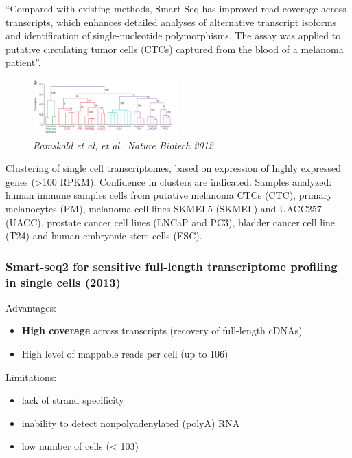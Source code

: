 ``Compared with existing methods, Smart-Seq has improved read coverage
across transcripts, which enhances detailed analyses of alternative
transcript isoforms and identification of single-nucleotide
polymorphisms. The assay was applied to putative circulating tumor cells
(CTCs) captured from the blood of a melanoma patient''.

\begin{figure}
\centering
\includegraphics[width=0.5\textwidth]{images/Screen_Shot_2023-02-21_at_19-30-18.png}
\caption{\emph{Ramskold et al, et al.~Nature Biotech 2012}}
\end{figure}

Clustering of single cell transcriptomes, based on expression of highly
expressed genes (\textgreater100 RPKM). Confidence in clusters are
indicated. Samples analyzed: human immune samples cells from putative
melanoma CTCs (CTC), primary melanocytes (PM), melanoma cell lines
SKMEL5 (SKMEL) and UACC257 (UACC), prostate cancer cell lines (LNCaP and
PC3), bladder cancer cell line (T24) and human embryonic stem cells
(ESC).

\hypertarget{smart-seq2-for-sensitive-full-length-transcriptome-profiling-in-single-cells-2013}{%
\subsubsection{Smart-seq2 for sensitive full-length transcriptome
profiling in single cells
(2013)}\label{smart-seq2-for-sensitive-full-length-transcriptome-profiling-in-single-cells-2013}}

Advantages:

\begin{itemize}
\tightlist
\item
  \textbf{High coverage} across transcripts (recovery of full-length
  cDNAs)
\item
  High level of mappable reads per cell (up to 106)
\end{itemize}

Limitations:

\begin{itemize}
\tightlist
\item
  lack of strand specificity
\item
  inability to detect nonpolyadenylated (polyA) RNA
\item
  low number of cells (\textless{} 103)
\end{itemize}

